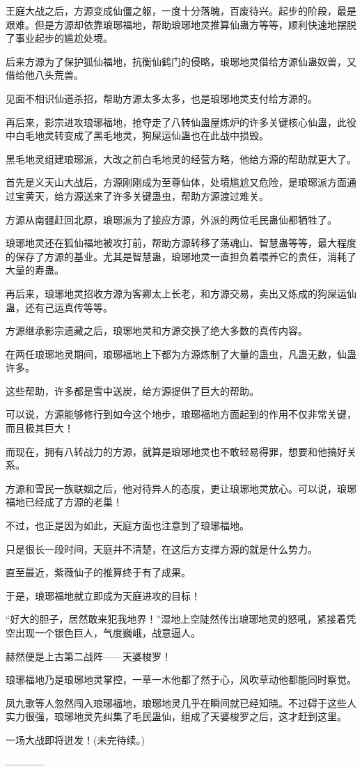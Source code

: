 \begin{this_body}
王庭大战之后，方源变成仙僵之躯，一度十分落魄，百废待兴。起步的阶段，最是艰难。但是方源却依靠琅琊福地，帮助琅琊地灵推算仙蛊方等等，顺利快速地摆脱了事业起步的尴尬处境。

后来方源为了保护狐仙福地，抗衡仙鹤门的侵略，琅琊地灵借给方源仙蛊奴兽，又借给他八头荒兽。

见面不相识仙道杀招，帮助方源太多太多，也是琅琊地灵支付给方源的。

再后来，影宗进攻琅琊福地，抢夺走了八转仙蛊屋炼炉的许多关键核心仙蛊，此役中白毛地灵转变成了黑毛地灵，狗屎运仙蛊也在此战中损毁。

黑毛地灵组建琅琊派，大改之前白毛地灵的经营方略，他给方源的帮助就更大了。

首先是义天山大战后，方源刚刚成为至尊仙体，处境尴尬又危险，是琅琊派方面通过宝黄天，给方源送来了许多关键蛊虫，帮助方源渡过难关。

方源从南疆赶回北原，琅琊派为了接应方源，外派的两位毛民蛊仙都牺牲了。

琅琊地灵还在狐仙福地被攻打前，帮助方源转移了荡魂山、智慧蛊等等，最大程度的保存了方源的基业。尤其是智慧蛊，琅琊地灵一直担负着喂养它的责任，消耗了大量的寿蛊。

再后来，琅琊地灵招收方源为客卿太上长老，和方源交易，卖出又炼成的狗屎运仙蛊，还有己运真传等等。

方源继承影宗遗藏之后，琅琊地灵和方源交换了绝大多数的真传内容。

在两任琅琊地灵期间，琅琊福地上下都为方源炼制了大量的蛊虫，凡蛊无数，仙蛊许多。

这些帮助，许多都是雪中送炭，给方源提供了巨大的帮助。

可以说，方源能够修行到如今这个地步，琅琊福地方面起到的作用不仅非常关键，而且极其巨大！

而现在，拥有八转战力的方源，就算是琅琊地灵也不敢轻易得罪，想要和他搞好关系。

方源和雪民一族联姻之后，他对待异人的态度，更让琅琊地灵放心。可以说，琅琊福地已经成了方源的老巢！

不过，也正是因为如此，天庭方面也注意到了琅琊福地。

只是很长一段时间，天庭并不清楚，在这后方支撑方源的就是什么势力。

直至最近，紫薇仙子的推算终于有了成果。

于是，琅琊福地就立即成为天庭进攻的目标！

“好大的胆子，居然敢来犯我地界！”湿地上空陡然传出琅琊地灵的怒吼，紧接着凭空出现一个银色巨人，气度巍峨，战意逼人。

赫然便是上古第二战阵——天婆梭罗！

琅琊福地乃是琅琊地灵掌控，一草一木他都了然于心，风吹草动他都能同时察觉。

凤九歌等人忽然闯入琅琊福地，琅琊地灵几乎在瞬间就已经知晓。不过碍于这些人实力很强，琅琊地灵先纠集了毛民蛊仙，组成了天婆梭罗之后，这才赶到这里。

一场大战即将迸发！(未完待续。)

------------

\end{this_body}

